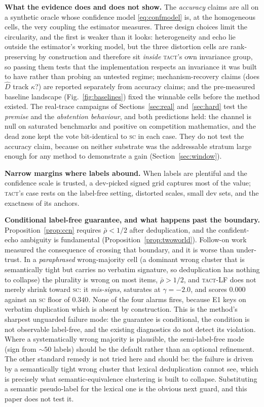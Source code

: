 \documentclass[twoside,11pt]{article}
\newcommand{\Dhat}{\widehat{D}}
\newcommand{\SC}{\textsc{sc}}
\newcommand{\TACT}{\textsc{tact}}
\begin{document}
\textbf{What the evidence does and does not show.} The \emph{accuracy} claims are all on a synthetic oracle whose confidence model \eqref{eq:confmodel} is, at the homogeneous cells, the very coupling the estimator measures. Three design choices limit the circularity, and the first is weaker than it
looks: heterogeneity and echo lie outside the estimator's working model, but
the three distortion cells are rank-preserving by construction and therefore
sit \emph{inside} \TACT's own invariance group, so passing them tests that the
implementation respects an invariance it was built to have rather than
probing an untested regime; mechanism-recovery claims (does $\Dhat$ track $\kappa$?) are reported separately from accuracy claims; and the pre-measured baseline landscape (Fig.~\ref{fig:baselines}) fixed the winnable cells before the method existed. The real-trace campaigns of Sections~\ref{sec:real} and~\ref{sec:hard} test the \emph{premise} and the \emph{abstention behaviour}, and both predictions held: the channel is null on saturated benchmarks and positive on competition mathematics, and the dead zone kept the vote bit-identical to \SC{} in each case. They do not test the accuracy claim, because on neither substrate was the addressable stratum large enough for any method to demonstrate a gain (Section~\ref{sec:window}).

\textbf{Narrow margins where labels abound.} When labels are plentiful and the confidence scale is trusted, a dev-picked signed grid captures most of the value; \TACT's case rests on the label-free setting, distorted scales, small dev sets, and the exactness of its anchors.

\textbf{Conditional label-free guarantee, and what happens past the boundary.}
Proposition~\ref{prop:ccn} requires $\bar\rho<1/2$ after deduplication, and the
confident-echo ambiguity is fundamental (Proposition~\ref{prop:twoworld}).
Follow-on work measured the consequence of crossing that boundary, and it is
worse than under-trust. In a \emph{paraphrased} wrong-majority cell (a dominant
wrong cluster that is semantically tight but carries no verbatim signature, so
deduplication has nothing to collapse) the plurality is wrong on most items,
$\bar\rho>1/2$, and \TACT-LF does not merely shrink toward \SC: it
\emph{mis-signs}, saturates at $\gamma=-2.0$, and scores $0.000$ against an
\SC{} floor of $0.340$. None of the four alarms fires, because E1 keys on
verbatim duplication which is absent by construction. This is the method's
sharpest unguarded failure mode: the guarantee is conditional, the condition is
not observable label-free, and the existing diagnostics do not detect its
violation. Where a systematically wrong majority is plausible, the
semi-label-free mode (sign from ${\sim}50$ labels) should be the default rather
than an optional refinement. The other standard remedy is not tried here and
should be: the failure is driven by a semantically tight wrong cluster that
lexical deduplication cannot see, which is precisely what semantic-equivalence
clustering \citep{kuhn2023semantic} is built to collapse. Substituting a
semantic pseudo-label for the lexical one is the obvious next guard, and this
paper does not test it.
\end{document}
